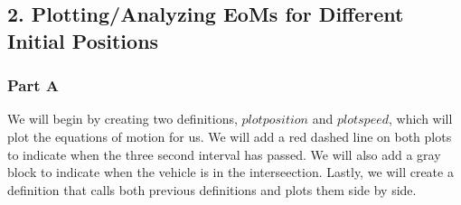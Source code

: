 \documentclass[11pt]{article}
\begin{document}
    \subsection{2. Plotting/Analyzing EoMs for Different Initial
Positions}\label{plottinganalyzing-eoms-for-different-initial-positions}

    \subsubsection{Part A}\label{part-a}

    We will begin by creating two definitions, \(plotposition\) and
\(plotspeed\), which will plot the equations of motion for us. We will
add a red dashed line on both plots to indicate when the three second
interval has passed. We will also add a gray block to indicate when the
vehicle is in the interseection. Lastly, we will create a definition
that calls both previous definitions and plots them side by side.
\end{document}
